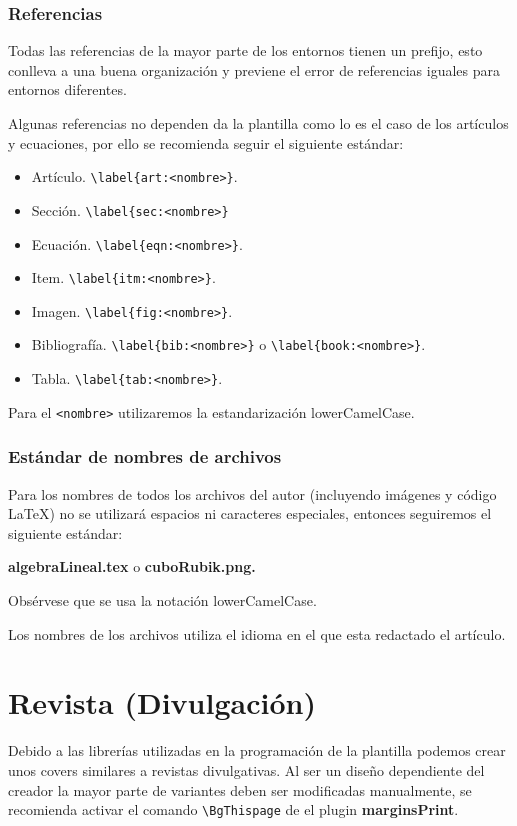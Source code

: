 {	\subsubsection{Referencias}
	Todas las referencias de la mayor parte de los entornos tienen un prefijo, esto conlleva a una buena organización y previene el error de referencias iguales para entornos diferentes.
	\begin{mybox}[Convención]
		Algunas referencias no dependen da la plantilla como lo es el caso de los artículos y ecuaciones, por ello se recomienda seguir el siguiente  estándar: 
		\begin{itemize}
			\item Artículo. \verb|\label{art:<nombre>}|.
			\item Sección. \verb|\label{sec:<nombre>}|
			\item Ecuación. \verb|\label{eqn:<nombre>}|.
			\item Item. \verb|\label{itm:<nombre>}|.
			\item Imagen. \verb|\label{fig:<nombre>}|.
			\item Bibliografía. \verb|\label{bib:<nombre>}| o \verb|\label{book:<nombre>}|.
			\item Tabla. \verb|\label{tab:<nombre>}|.
		\end{itemize}
		\begin{mynote}
			Para el \verb|<nombre>| utilizaremos la estandarización lowerCamelCase. 
		\end{mynote}
	\end{mybox}
	\subsubsection{Estándar de nombres de archivos}
	Para los nombres de todos los archivos del autor (incluyendo imágenes y código \LaTeX) no se utilizará espacios ni caracteres especiales, entonces seguiremos el siguiente estándar: 
	\begin{center}
		\textbf{algebraLineal.tex} o \textbf{cuboRubik.png.}
	\end{center}
	Obsérvese que se usa la notación lowerCamelCase.
	\begin{mynote}
		Los nombres de los archivos utiliza el idioma en el que esta redactado el artículo.
	\end{mynote}
	\section{Revista (Divulgación)}
		Debido a las librerías utilizadas en la programación de la plantilla podemos crear unos covers similares a revistas divulgativas. Al ser un diseño dependiente del creador la mayor parte de variantes deben ser modificadas manualmente, se recomienda activar el comando \verb|\BgThispage| de el plugin \textbf{marginsPrint}.
	\newpage
}
